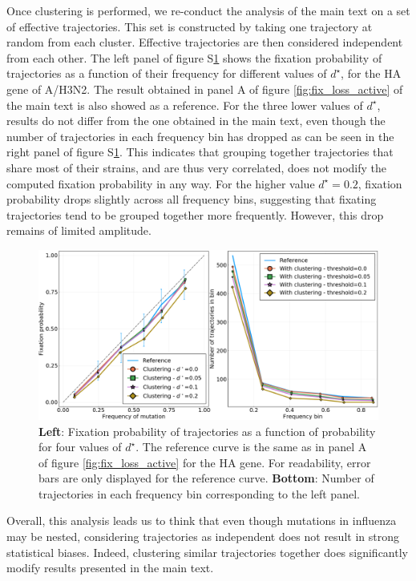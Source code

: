 \documentclass[reprint,amsmath,amssymb,superscriptaddress,showpacs,rmp]{revtex4-1}
\newcommand{\sref}[1]{S\ref{#1}}
\begin{document}
Once clustering is performed, we re-conduct the analysis of the main text on a set of effective trajectories.
This set is constructed by taking one trajectory at random from each cluster.
Effective trajectories are then considered independent from each other.
The left panel of figure \sref{fig:pfix_v_freq_clusters} shows the fixation probability of trajectories as a function of their frequency for different values of $d^\star$, for the HA gene of A/H3N2.
The result obtained in panel A of figure \ref{fig:fix_loss_active} of the main text is also showed as a reference.
For the three lower values of $d^\star$, results do not differ from the one obtained in the main text, even though the number of trajectories in each frequency bin has dropped as can be seen in the right panel of figure \sref{fig:pfix_v_freq_clusters}.
This indicates that grouping together trajectories that share most of their strains, and are thus very correlated, does not modify the computed fixation probability in any way.
For the higher value $d^\star=0.2$, fixation probability drops slightly across all frequency bins, suggesting that fixating trajectories tend to be grouped together more frequently.
However, this drop remains of limited amplitude.

\begin{figure}
	\centering
	\includegraphics[scale=0.5]{Rev_figures/Pfix_v_freq_clustering_panel.png}
	\caption{\textbf{Left}: Fixation probability of trajectories as a function of probability for four values of $d^\star$. The reference curve is the same as in panel A of figure \ref{fig:fix_loss_active} for the HA gene. For readability, error bars are only displayed for the reference curve. \textbf{Bottom}: Number of trajectories in each frequency bin corresponding to the left panel.}
	\label{fig:pfix_v_freq_clusters}
\end{figure}

Overall, this analysis leads us to think that even though mutations in influenza may be nested, considering trajectories as independent does not result in strong statistical biases.
Indeed, clustering similar trajectories together does significantly modify results presented in the main text.
\end{document}
